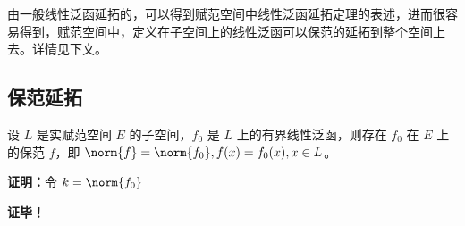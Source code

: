 

由一般线性泛函延拓的，可以得到赋范空间中线性泛函延拓定理的表述，进而很容易得到，赋范空间中，定义在子空间上的线性泛函可以保范的延拓到整个空间上去。详情见下文。

\subsection{保范延拓}

\begin{theorem}{}
设 $L$ 是实赋范空间 $E$ 的子空间，$f_0$ 是 $L$ 上的有界线性泛函，则存在 $f_0$ 在 $E$ 上的保范 $f$，即 $\norm{f}=\norm{f_0},f(x)=f_0(x),x\in L$。
\end{theorem}

\textbf{证明：}令 $k=\norm{f_0}$


\textbf{证毕！}
